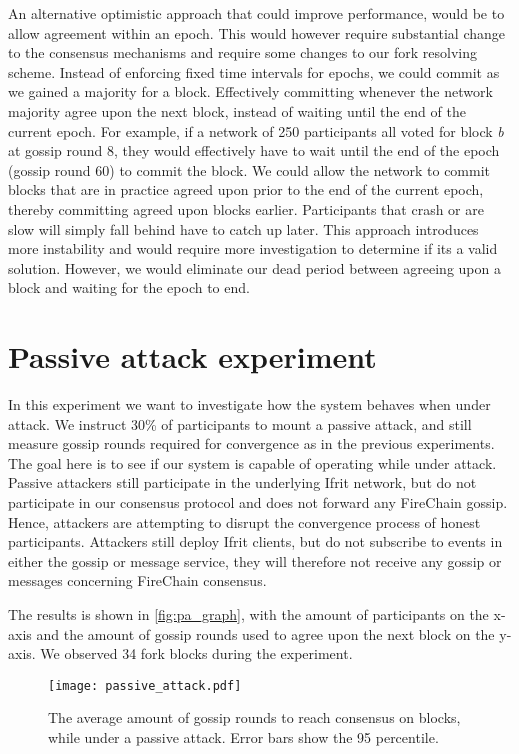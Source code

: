 \documentclass[USenglish]{uit-thesis}
\begin{document}
 

An alternative optimistic approach that could improve performance, would be to allow agreement within an epoch. 
This would however require substantial change to the consensus mechanisms and require some changes to our fork resolving scheme.
Instead of enforcing fixed time intervals for epochs, we could commit as we gained a majority for a block.
Effectively committing whenever the network majority agree upon the next block, instead of waiting until the end of the current epoch.
For example, if a network of 250 participants all voted for block \textit{b} at gossip round 8, they would effectively have to wait until the end of the epoch (gossip round 60) to commit the block.
We could allow the network to commit blocks that are in practice agreed upon prior to the end of the current epoch, thereby committing agreed upon blocks earlier. 
Participants that crash or are slow will simply fall behind have to catch up later.
This approach introduces more instability and would require more investigation to determine if its a valid solution.
However, we would eliminate our dead period between agreeing upon a block and waiting for the epoch to end.

 

 


\section{Passive attack experiment}
In this experiment we want to investigate how the system behaves when under attack.
We instruct 30\% of participants to mount a passive attack, and still measure gossip rounds required for convergence as in the previous experiments.
The goal here is to see if our system is capable of operating while under attack.
Passive attackers still participate in the underlying Ifrit network, but do not participate in our consensus protocol and does not forward any FireChain gossip.
Hence, attackers are attempting to disrupt the convergence process of honest participants.
Attackers still deploy Ifrit clients, but do not subscribe to events in either the gossip or message service, they will therefore not receive any gossip or messages concerning FireChain consensus.


The results is shown in \autoref{fig:pa_graph}, with the amount of participants on the x-axis and the amount of gossip rounds used to agree upon the next block on the y-axis.
We observed 34 fork blocks during the experiment.
\begin{figure}[h]
	\centering
	\texttt{[image: passive\_attack.pdf]}
	\caption[Acheiving consensus when under attack.]{The average amount of gossip rounds to reach consensus on blocks, while under a passive attack. Error bars show the 95 percentile.  }
	\label{fig:pa_graph}
\end{figure}
\end{document}

